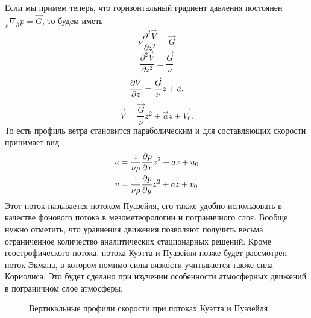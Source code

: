     Если мы примем теперь, что горизонтальный градиент давления постоянен  $\frac{1}{\rho}\nabla_h p=\vec{G}$, то будем иметь
    \begin{equation}
        \nu\frac{\partial^2 \vec{V}}{\partial z^2}=\vec{G} 
    \end{equation} 
    \begin{equation}
        \frac{\partial^2 \vec{V}}{\partial z^2}=\frac{\vec{G}}{\nu}  
    \end{equation} 
    \begin{equation}
        \displaystyle\frac{\partial \vec{V}}{\partial z}=\frac{\vec{G}}{\nu}z+\vec{a}.  
    \end{equation} 
    \begin{equation}
        \vec{V}=\frac{\vec{G}}{\nu}z^2+\vec{a}z+\vec{V_0}. 
    \end{equation} 
    То есть профиль ветра становится параболическим и для составляющих скорости принимает вид
    \begin{equation}
    \begin{aligned} 
        u &= \frac{1}{\nu\rho} \displaystyle\frac{\partial p}{\partial x}z^2 + az + u_0 \\
        v &= \frac{1}{\nu\rho} \displaystyle\frac{\partial p}{\partial y}z^2 + az + v_0 
    \end{aligned} 
    \end{equation} 
    Этот поток называется потоком Пуазейля, его также удобно использовать в качестве фонового потока в мезометеорологии и пограничного слоя. Вообще нужно отметить, что уравнения движения позволяют получить весьма ограниченное количество аналитических стационарных решений. Кроме геострофического потока, потока Куэтта и Пуазейля позже будет рассмотрен поток Экмана, в котором помимо силы вязкости учитывается также сила Кориолиса. Это будет сделано при изучении особенности атмосферных движений в пограничном слое атмосферы. 

    \begin{figure}[!h]
    \label{fig:simple_flows}
    \caption{Вертикальные профили скорости при потоках Куэтта и Пуазейля}
    \centering
    \end{figure}


